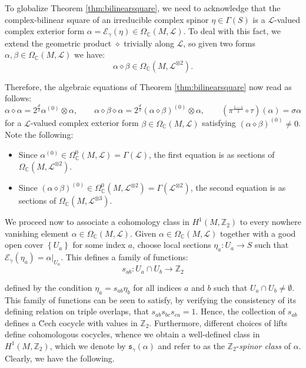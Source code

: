 \documentclass[10pt,a4paper,twoside,reqno]{amsart}
\theoremstyle{plain}
\theoremstyle{definition}
\theoremstyle{remark}
\def\C{\mathbb{C}}
\def\cE{\mathcal{E}}
\def\cL{\mathcal{L}}
\begin{document}
To globalize Theorem \ref{thm:bilinearsquare}, we need to acknowledge that the complex-bilinear square of an irreducible complex spinor $\eta\in\Gamma(S)$ is a $\cL$-valued complex exterior form $\alpha=\cE_\gamma(\eta)\in\Omega_\C(M,\cL)$. To deal with this fact, we extend the geometric product $\diamond$ trivially along $\cL$, so given two forms $\alpha,\beta \in \Omega_{\C}(M,\cL)$ we have:
\begin{equation*}
\alpha \diamond \beta \in \Omega_\C(M,\cL^{\otimes 2}).
\end{equation*}

Therefore, the algebraic equations of Theorem \ref{thm:bilinearsquare} now read as follows: $$\alpha\diamond\alpha = 2^{\frac{d}{2}}\alpha^{(0)}\otimes\alpha,\qquad \alpha\diamond\beta\diamond\alpha=2^{\frac{d}{2}}(\alpha\diamond\beta)^{(0)}\otimes\alpha,\qquad (\pi^{\frac{1-s}{2}}\circ\tau)(\alpha)=\sigma\alpha$$ for a $\cL$-valued complex exterior form $\beta\in\Omega_\C(M,\cL)$ satisfying $(\alpha\diamond\beta)^{(0)}\neq0$. Note the following: \begin{itemize}
    \item Since $\alpha^{(0)}\in\Omega_\C^0(M,\cL)=\Gamma(\cL)$, the first equation is as sections of $\Omega_\C(M,\cL^{\otimes2})$.
    \item Since $(\alpha\diamond\beta)^{(0)}\in\Omega_\C^0(M,\cL^{\otimes2})=\Gamma(\cL^{\otimes2})$, the second equation is as sections of $\Omega_\C(M,\cL^{\otimes3})$.
\end{itemize}

We proceed now to associate a cohomology class in $H^1(M,\mathbb{Z}_2)$ to every nowhere vanishing element $\alpha \in \Omega_{\C}(M,\cL)$. Given $\alpha \in \Omega_{\C}(M,\cL)$ together with a good open cover $\left\{ U_a \right\}$ for some index $a$, choose local sections $\eta_a \colon U_a \to S$ such that $\cE_{\gamma}(\eta_a) = \alpha\vert_{U_a}$. This defines a family of functions:
\begin{equation*}
s_{ab} \colon U_a\cap U_b \to \mathbb{Z}_2
\end{equation*}

\noindent
defined by the condition $\eta_a = s_{ab} \eta_b$ for all indices $a$ and $b$ such that $U_a\cap U_b \neq \emptyset$. This family of functions can be seen to satisfy, by verifying the consistency of its defining relation on triple overlaps, that $s_{ab}s_{bc}s_{ca} = 1$. Hence, the collection of $s_{ab}$ defines a \u{C}ech cocycle with values in $\mathbb{Z}_2$. Furthermore, different choices of lifts define cohomologous cocycles, whence we obtain a well-defined class in $H^1(M,\mathbb{Z}_2)$, which we denote by $\mathfrak{s}_{\gamma}(\alpha)$ and refer to as the $\mathbb{Z}_2$-\emph{spinor class} of $\alpha$. Clearly, we have the following.
\end{document}
